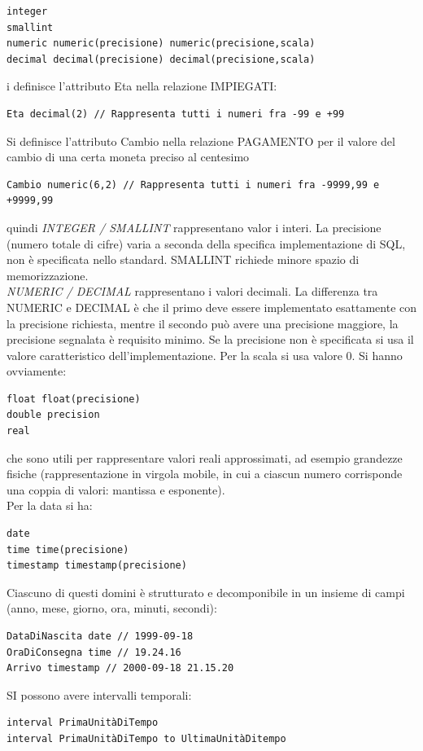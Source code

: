 \documentclass[a4paper,12pt, oneside]{book}
\begin{document}
\begin{verbatim}
integer
smallint
numeric numeric(precisione) numeric(precisione,scala)
decimal decimal(precisione) decimal(precisione,scala)
\end{verbatim}
\begin{esempio}
i definisce l'attributo Eta nella relazione IMPIEGATI:
\begin{verbatim}
Eta decimal(2) // Rappresenta tutti i numeri fra -99 e +99
\end{verbatim}
Si definisce l'attributo Cambio nella relazione PAGAMENTO per  
il valore del cambio di una certa moneta preciso al centesimo
\begin{verbatim}
Cambio numeric(6,2) // Rappresenta tutti i numeri fra -9999,99 e +9999,99
\end{verbatim}
\end{esempio}
quindi \textit{INTEGER / SMALLINT} rappresentano valor i interi. La precisione (numero totale di cifre) varia a seconda della specifica
implementazione di SQL, non è specificata nello standard.
SMALLINT richiede minore spazio di memorizzazione.\\
\textit{NUMERIC / DECIMAL} rappresentano i valori decimali.
La differenza tra NUMERIC e DECIMAL è che il primo deve essere implementato esattamente con la precisione richiesta, mentre il secondo può avere una precisione maggiore, la precisione segnalata è requisito minimo. Se la precisione non è specificata si usa il valore caratteristico
dell'implementazione. Per la scala si usa valore 0. Si hanno ovviamente:
\begin{verbatim}
float float(precisione)
double precision
real
\end{verbatim}
che sono utili per rappresentare valori reali approssimati, ad esempio grandezze fisiche (rappresentazione in virgola mobile, in cui a ciascun numero corrisponde una coppia di valori: mantissa e esponente).\\
Per la data si ha:
\begin{verbatim}
date
time time(precisione)
timestamp timestamp(precisione)
\end{verbatim}
Ciascuno di questi domini è strutturato e decomponibile in un
insieme di campi (anno, mese, giorno, ora, minuti, secondi):
\begin{verbatim}
DataDiNascita date // 1999-09-18
OraDiConsegna time // 19.24.16
Arrivo timestamp // 2000-09-18 21.15.20
\end{verbatim}
SI possono avere intervalli temporali:
\begin{verbatim}
interval PrimaUnitàDiTempo
interval PrimaUnitàDiTempo to UltimaUnitàDitempo
\end{verbatim}
\end{document}
